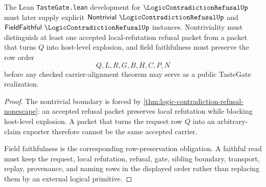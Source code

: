 \begin{theorem}
\label{thm:logic-contradiction-refusal-tastegate-obligation}
The Lean \texttt{TasteGate.lean} development for $\LogicContradictionRefusalUp$ must later supply explicit $\mathsf{Nontrivial}\ \LogicContradictionRefusalUp$ and $\mathsf{FieldFaithful}\ \LogicContradictionRefusalUp$ instances. Nontriviality must distinguish at least one accepted local-refutation refusal packet from a packet that turns $Q$ into host-level explosion, and field faithfulness must preserve the row order
$$
Q,L,R,G,B,H,C,P,N
$$
before any checked carrier-alignment theorem may serve as a public TasteGate realization.
\end{theorem}
\begin{proof}
The nontrivial boundary is forced by \autoref{thm:logic-contradiction-refusal-nonescape}: an accepted refusal packet preserves local refutation while blocking host-level explosion. A packet that turns the request row $Q$ into an arbitrary-claim exporter therefore cannot be the same accepted carrier.

Field faithfulness is the corresponding row-preservation obligation. A faithful read must keep the request, local refutation, refusal, gate, sibling boundary, transport, replay, provenance, and naming rows in the displayed order rather than replacing them by an external logical primitive.
\end{proof}




